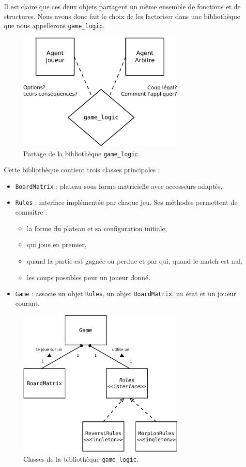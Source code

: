 Il est claire que ces deux objets partagent un même ensemble de fonctions et de structures. Nous avons donc fait le choix de les factoriser dans une bibliothèque que nous appellerons \texttt{game\_logic}.
\begin{figure}[H] 
\centering
\includegraphics[width=0.75\textwidth]{files/env/game_logic_shared} 
\caption{Partage de la bibliothèque \texttt{game\_logic}.} 
\label{game_logic_shared}
\end{figure}
Cette bibliothèque contient trois classes principales :
\begin{itemize}
\item \texttt{BoardMatrix} : plateau sous forme matricielle avec accesseurs adaptés,
\item \texttt{Rules} : interface implémentée par chaque jeu. Ses méthodes permettent de connaître :
\begin{itemize}
\item la forme du plateau et sa configuration initiale,
\item qui joue en premier,
\item quand la partie est gagnée ou perdue et par qui, quand le match est nul,
\item les coups possibles pour un joueur donné.
\end{itemize}
\item \texttt{Game} : associe un objet \texttt{Rules}, un objet \texttt{BoardMatrix}, un état et un joueur courant.
\end{itemize}
\begin{figure}[H] 
\centering
\includegraphics[width=0.75\textwidth]{files/env/game_logic} 
\caption{Classes de la bibliothèque \texttt{game\_logic}.} 
\label{game_logic}
\end{figure}

